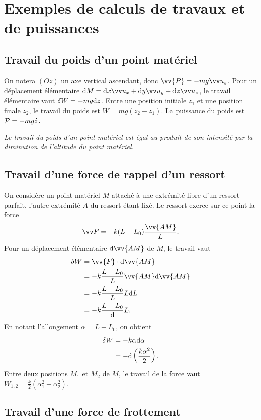 \section{Exemples de calculs de travaux et de puissances}
\label{chap-4sec:exemplesdecalculs}
\subsection{Travail du poids d'un point matériel}
\label{chap4-subsec:travaildupoids}
On notera $(Oz)$ un axe vertical ascendant, donc $\vv{P}=-mg\uz$. Pour un déplacement élémentaire $\D M = \D x \ux + \D y \uy + \D z \uz$, le travail élémentaire vaut $\delta W = -mg\D z$. Entre une position initiale $z_1$ et une position finale $z_2$, le travail du poids est $W=mg(z_2-z_1)$. La puissance du poids est $\P=-mg\dot{z}$.

\emph{Le travail du poids d'un point matériel est égal au produit de son intensité par la diminution de l'altitude du point matériel.}

\subsection{Travail d'une force de rappel d'un ressort}
\label{chap4-subsec:travailduneforcederappel}

On considère un point matériel $M$ attaché à une extrémité libre d'un ressort parfait, l'autre extrémité $A$ du ressort étant fixé. Le ressort exerce sur ce point la force
\begin{equation}
  \vF = -k(L-L_0)\frac{\vv{AM}}{L}.
\end{equation}
Pour un déplacement élémentaire $\D \vv{AM}$ de $M$, le travail vaut
\begin{align}
  \delta W &= \vv{F} \cdot \D \vv{AM} \\
  &= -k \frac{L-L_0}{L} \vv{AM} \D \vv{AM} \\
  &= -k \frac{L-L_0}{L} L \D L \\
  &= -k \frac{L-L_0} \D L.
\end{align}
En notant l'allongement $\alpha = L-L_0$, on obtient
\begin{align}
  \delta W &= -k\alpha \D \alpha\\
  &=-\D \left(\frac{k\alpha^2}{2}\right).
\end{align}
Entre deux positions $M_1$ et $M_2$ de $M$, le travail de la force vaut $W_{1,2}=\frac{k}{2}(\alpha_1^2-\alpha_2^2)$.

\subsection{Travail d'une force de frottement}
\label{chap4-subsec:travaildufrottement}

